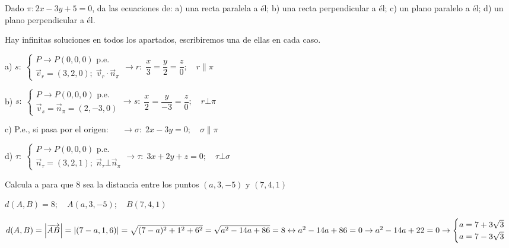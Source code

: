 \begin{ejre} Dado $\pi: 2x-3y+5=0$, da las ecuaciones de:
		a) una recta paralela a él;		
		b) una recta perpendicular a él;
		c) un plano paralelo a él; 		
		d) un  plano perpendicular a él.
\end{ejre}
\begin{proofw}\renewcommand{\qedsymbol}{$\diamond$}	

Hay infinitas soluciones en todos los apartados, escribiremos una de ellas en cada caso.

\noindent a) $s:\; \begin{cases} P \to P(0,0,0) \text{ p.e.}\\ \vec v_r= (3,2,0) ; \; \vec v_r \cdot \vec n_{\pi} \end{cases} \to r:\; \dfrac{x}{3}=\dfrac{y}{2}=\dfrac{z}{0}; \quad r \parallel \pi$

\noindent b) $s:\; \begin{cases} P \to P(0,0,0) \text{ p.e.}\\ \vec v_s= \vec n_{\pi}=(2,-3,0) \end{cases} \to s:\; \dfrac{x}{2}=\dfrac{y}{-3}=\dfrac{z}{0};\quad r\bot \pi$

\noindent c) P.e., si pasa por el origen: $\quad\; \to \sigma:\; 2x-3y=0;\quad \sigma \parallel \pi$

\noindent d) $\tau:\; \begin{cases} P \to P(0,0,0) \text{ p.e.}\\ \vec n_{\tau}=(3,2,1);\; \vec n_{\tau} \bot \vec n_{\pi} \end{cases} \to \tau:\; 3x+2y+z=0;\quad \tau \bot \sigma$

	
\end{proofw}		
		

	
\begin{ejre} Calcula a para que $8$ sea la distancia entre los puntos $(a,3,-5)$ y $(7,4,1)$	
\end{ejre}

\begin{proofw}\renewcommand{\qedsymbol}{$\diamond$}	
$d(A,B)=8; \quad A(a,3,-5);\quad B(7,4,1)$

\noindent $d(A,B)=\abs{\overrightarrow{AB}}=\abs{(7-a,1,6)}= \sqrt{(7-a)^2+1^2+6^2}=\sqrt{a^2-14a+86}=8\leftrightarrow a^2-14a+86=0 \to a^2-14a+22=0 \to \begin{cases} a=7+3\sqrt{3}\\a=7-3\sqrt{3}\end{cases}$
\end{proofw}

